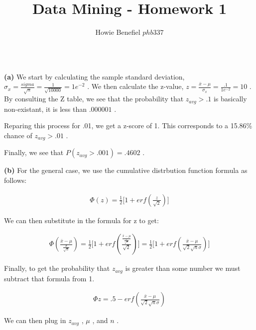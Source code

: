 \documentclass[12pt]{article}
\newenvironment{problem}[2][Problem]{\begin{trivlist}
\item[\hskip \labelsep {\bfseries #1}\hskip \labelsep {\bfseries #2.}]}{\end{trivlist}}
\newenvironment{subproblem}[1]{\textbf{(#1)}}{}
\theoremstyle{definition}
\begin{document}

\title{Data Mining - Homework 1}
\author{Howie Benefiel \(phb337\)}
\maketitle

\begin{problem}{1}
$ $ \newline

\begin{subproblem}{a}
We start by calculating the sample standard deviation, $ \sigma_x = \frac{sigma}{\sqrt{n}} = \frac{1}{\sqrt{10000}} = 1e^{-2}  $ .
We then calculate the z-value, $ z=\frac{\bar{x} - \mu}{\sigma_x} = \frac{.1}{1e^{-2}} = 10 $ .
By consulting the Z table, we see that the probability that $ z_{avg} > .1 $ is basically non-existant, it is less than $ .000001 $ .

Reparing this process for .01, we get a z-score of 1.
This corresponds to a 15.86\% chance of $ z_{avg} > .01 $ .

Finally, we see that $ P(z_{avg} > .001) = .4602 $ .
\end{subproblem}

\begin{subproblem}{b}
For the general case, we use the cumulative distrbution function formula as follows:

\begin{align}
\Phi(z) = \frac{1}{2} \lbrack 1 + erf(\frac{z}{\sqrt{2}}) \rbrack
\end{align}

We can then substitute in the formula for z to get:

\begin{align}
\Phi(\frac{\bar{x} - \mu}{\frac{\sigma}{\sqrt{n}}}) = \frac{1}{2} \lbrack 1 + erf(\frac{\frac{\bar{x} - \mu}{\frac{\sigma}{\sqrt{n}}}}{\sqrt{2}}) \rbrack =  \frac{1}{2} \lbrack 1 + erf(\frac{\bar{x} - \mu}{\sqrt{2}\sqrt{n}\sigma}) \rbrack
\end{align}

Finally, to get the probability that $ z_{avg} $ is greater than some number we must subtract that formula from 1.

\begin{align}
\Phi{z} = .5 - erf(\frac{\bar{x} - \mu}{\sqrt{2}\sqrt{n}\sigma})
\end{align}

We can then plug in $ z_{avg} $ , $ \mu $ , and $ n $ .

\end{subproblem}

\end{problem}
\end{document}
